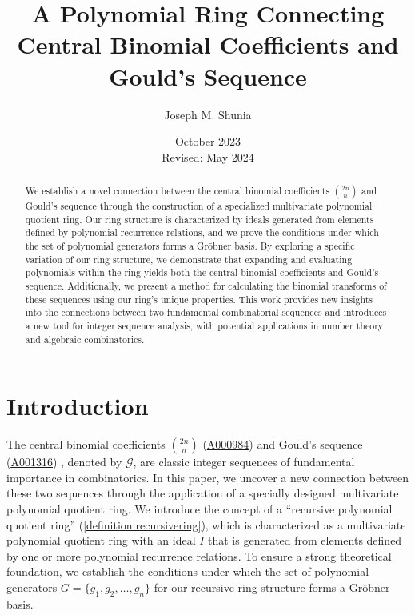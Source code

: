 \documentclass[12pt,reqno]{article}
\theoremstyle{plain}
\newcommand{\Goulds}{\mathcal{G}}
\newcommand{\seqnum}[1]{\href{https://oeis.org/#1}{\rm \underline{#1}}}
\begin{document}
\title{A Polynomial Ring Connecting Central Binomial Coefficients and Gould's Sequence}
\author{Joseph M. Shunia}
\date{October 2023 \\ \small Revised: May 2024 \normalsize}
\maketitle

\begin{abstract}
We establish a novel connection between the central binomial coefficients $\binom{2n}{n}$ and Gould's sequence through the construction of a specialized multivariate polynomial quotient ring. Our ring structure is characterized by ideals generated from elements defined by polynomial recurrence relations, and we prove the conditions under which the set of polynomial generators forms a Gr\"obner basis. By exploring a specific variation of our ring structure, we demonstrate that expanding and evaluating polynomials within the ring yields both the central binomial coefficients and Gould's sequence. Additionally, we present a method for calculating the binomial transforms of these sequences using our ring's unique properties. This work provides new insights into the connections between two fundamental combinatorial sequences and introduces a new tool for integer sequence analysis, with potential applications in number theory and algebraic combinatorics.
\end{abstract}

\section{Introduction}
The central binomial coefficients $\binom{2n}{n}$ (\seqnum{A000984}) \cite{A000984} and Gould's sequence (\seqnum{A001316}) \cite{A001316}, denoted by $\Goulds$, are classic integer sequences of fundamental importance in combinatorics. In this paper, we uncover a new connection between these two sequences through the application of a specially designed multivariate polynomial quotient ring. We introduce the concept of a ``recursive polynomial quotient ring'' (\cref{definition:recursivering}), which is characterized as a multivariate polynomial quotient ring with an ideal $I$ that is generated from elements defined by one or more polynomial recurrence relations. To ensure a strong theoretical foundation, we establish the conditions under which the set of polynomial generators $G = \{ g_1, g_2, \ldots, g_n \}$ for our recursive ring structure forms a Gröbner basis.
\end{document}
